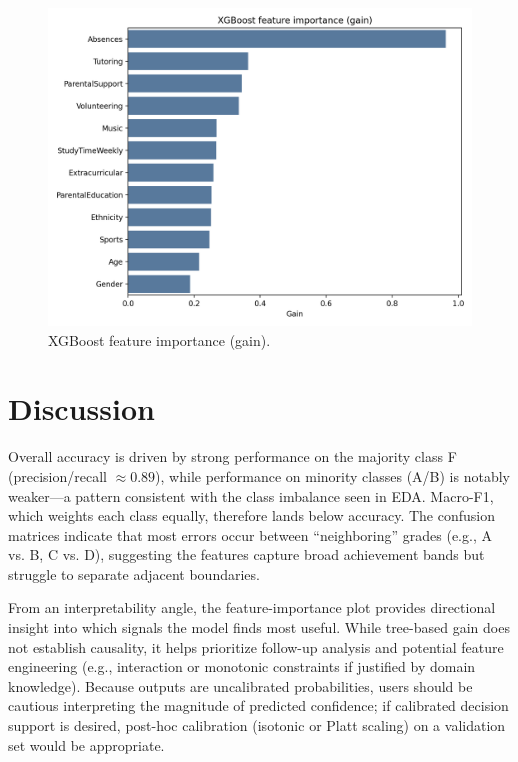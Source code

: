 \documentclass[11pt]{article}
\begin{document}
\begin{figure}[H]
  \centering
  \includegraphics[width=.8\textwidth]{../Checkpoint 2/figures/xgb_feature_importance.png}
  \caption{XGBoost feature importance (gain).}
\end{figure}

\section*{Discussion}
Overall accuracy is driven by strong performance on the majority class F (precision/recall $\approx 0.89$), while performance on minority classes (A/B) is notably weaker---a pattern consistent with the class imbalance seen in EDA. Macro-F1, which weights each class equally, therefore lands below accuracy. The confusion matrices indicate that most errors occur between ``neighboring'' grades (e.g., A vs. B, C vs. D), suggesting the features capture broad achievement bands but struggle to separate adjacent boundaries.

From an interpretability angle, the feature-importance plot provides directional insight into which signals the model finds most useful. While tree-based gain does not establish causality, it helps prioritize follow-up analysis and potential feature engineering (e.g., interaction or monotonic constraints if justified by domain knowledge). Because outputs are uncalibrated probabilities, users should be cautious interpreting the magnitude of predicted confidence; if calibrated decision support is desired, post-hoc calibration (isotonic or Platt scaling) on a validation set would be appropriate.
\end{document}
